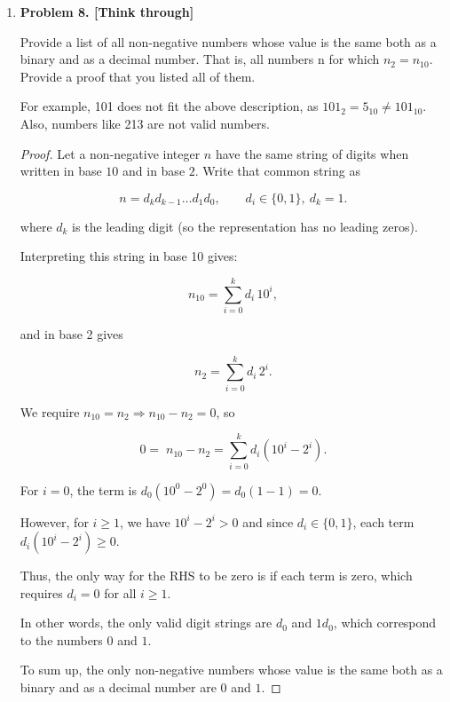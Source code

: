 \documentclass[11pt]{article}
\begin{document}
\begin{enumerate}
\begin{proof}
The infinite sum evaluates to
\[
\sum_{k=0}^{\infty} \frac{k+1}{2^k} = 4,
\]
so
\[
T(n) \leq 4n.
\]

On the other hand, each increment costs at least \(1\), so \(T(n) \geq n\).  
Thus,
\[
T(n) = \Theta(n).
\]

Finally, the amortized cost per increment is
\[
\frac{T(n)}{n} = \Theta(1),
\]
with an explicit upper bound of \(4\) units per increment.
\end{proof}

\item
\textbf{Problem 8. [Think through]}

Provide a list of all non-negative numbers whose value is the same both as a binary and as a decimal number. That is, all numbers n for which \(n_2 = n_{10}\). Provide a proof that you listed all of them.

For example, 101 does not fit the above description, as \(101_{2} = 5_{10} \neq 101_{10}\). Also, numbers like 213 are not valid numbers.

\begin{proof}

Let a non-negative integer \(n\) have the same string of digits when written in base \(10\) and in base \(2\). Write that common string as

\[
n = d_kd_{k-1}\dots d_1d_0,\qquad d_i\in\{0,1\},\ d_k=1.
\]

where \(d_k\) is the leading digit (so the representation has no leading zeros).

Interpreting this string in base 10 gives:

\[
n_{10}=\sum_{i=0}^k d_i\,10^i,
\]

and in base 2 gives

\[
n_2=\sum_{i=0}^k d_i\,2^i.
\]

We require \(n_{10}=n_2 \Rightarrow n_{10} - n_2 = 0\), so

\[
0=\;n_{10}-n_2=\sum_{i=0}^k d_i(10^i-2^i).
\]

For \(i=0\), the term is \(d_0(10^0-2^0)=d_0(1-1)=0\).

However, for \(i\ge1\), we have \(10^i-2^i>0\) and since \(d_i\in\{0,1\}\), each term \(d_i(10^i-2^i)\ge0\).

Thus, the only way for the RHS to be zero is if each term is zero, which requires \(d_i=0\) for all \(i\ge1\).

In other words, the only valid digit strings are \(d_0\) and \(1d_0\), which correspond to the numbers \(0\) and \(1\).

To sum up, the only non-negative numbers whose value is the same both as a binary and as a decimal number are \(0\) and \(1\).

\end{proof}

\end{enumerate}
\end{document}
